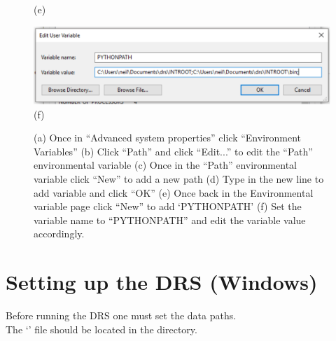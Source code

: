 \begin{figure}
\begin{center}
\begin{minipage}[t]{.29\textwidth}
\begin{center}
(e)
\end{center}
\end{minipage}
\begin{minipage}[t]{.29\textwidth}
\begin{center}
\includegraphics[width=\textwidth]{Figures/win/Win6.pdf}
(f)
\end{center}
\end{minipage}
\end{center}
\caption{(a) Once in ``Advanced system properties'' click ``Environment Variables'' (b) Click ``Path'' and click ``Edit...'' to edit the ``Path'' environmental variable (c) Once in the ``Path'' environmental variable click ``New'' to add a new path (d) Type in the new line to add variable and click ``OK'' (e) Once back in the Environmental variable page click ``New'' to add `PYTHONPATH' (f) Set the variable name to ``PYTHONPATH'' and edit the variable value accordingly. \label{figure:screengrabs} }
\end{figure}
\vspace{0.25cm}



\clearpage
\newpage
\section{Setting up the DRS (Windows)}
\label{ch:install:setup_win}

Before running the DRS one must set the data paths. \\

\noindent The `\configtxtfile' file should be located in the \userDIR directory.

